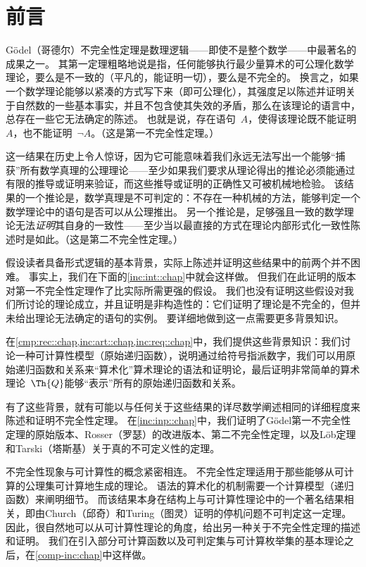 
\chapter{前言}

Gödel（哥德尔）不完全性定理是数理逻辑——即使不是整个数学——中最著名的成果之一。
其第一定理粗略地说是指，任何能够执行最少量算术的可公理化数学理论，要么是不一致的（平凡的，能证明一切），要么是不完全的。
换言之，如果一个数学理论能够以紧凑的方式写下来（即可公理化），其强度足以陈述并证明关于自然数的一些基本事实，并且不包含使其失效的矛盾，那么在该理论的语言中，总存在一些它无法确定的陈述。
也就是说，存在语句~$A$，使得该理论既不能证明$A$，也不能证明~$\lnot A$。（这是第一不完全性定理。）

这一结果在历史上令人惊讶，因为它可能意味着我们永远无法写出一个能够“捕获”所有数学真理的公理理论——至少如果我们要求从理论得出的推论必须能通过有限的推导或证明来验证，而这些推导或证明的正确性又可被机械地检验。
该结果的一个推论是，数学真理是不可判定的：不存在一种机械的方法，能够判定一个数学理论中的语句是否可以从公理推出。
另一个推论是，足够强且一致的数学理论无法\emph{证明}其自身的一致性——至少当以最直接的方式在理论内部形式化一致性陈述时是如此。（这是第二不完全性定理。）

假设读者具备形式逻辑的基本背景，实际上陈述并证明这些结果中的前两个并不困难。
事实上，我们在下面的\cref{inc:int::chap}中就会这样做。
但我们在此证明的版本对第一不完全性定理作了比实际所需更强的假设。
我们也没有证明这些假设对我们所讨论的理论成立，并且证明是非构造性的：它们证明了理论是不完全的，但并未给出理论无法确定的语句的实例。
要详细地做到这一点需要更多背景知识。

在\cref{cmp:rec::chap,inc:art::chap,inc:req::chap}中，我们提供这些背景知识：我们讨论一种可计算性模型（原始递归函数），说明通过给符号指派数字，我们可以用原始递归函数和关系来“算术化”算术理论的语法和证明论，最后证明非常简单的算术理论~$\Th{Q}$能够“表示”所有的原始递归函数和关系。

有了这些背景，就有可能以与任何关于这些结果的详尽数学阐述相同的详细程度来陈述和证明不完全性定理。
在\cref{inc:inp::chap}中，我们证明了Gödel第一不完全性定理的原始版本、Rosser（罗瑟）的改进版本、第二不完全性定理，以及Löb定理和Tarski（塔斯基）关于真的不可定义性的定理。

不完全性现象与可计算性的概念紧密相连。
不完全性定理适用于那些能够从可计算的公理集可计算地生成的理论。
语法的算术化的机制需要一个计算模型（递归函数）来阐明细节。
而该结果本身在结构上与可计算性理论中的一个著名结果相关，即由Church（邱奇）和Turing（图灵）证明的停机问题不可判定这一定理。
因此，很自然地可以从可计算性理论的角度，给出另一种关于不完全性定理的描述和证明。
我们在引入部分可计算函数以及可判定集与可计算枚举集的基本理论之后，在\cref{comp-inc:chap}中这样做。

